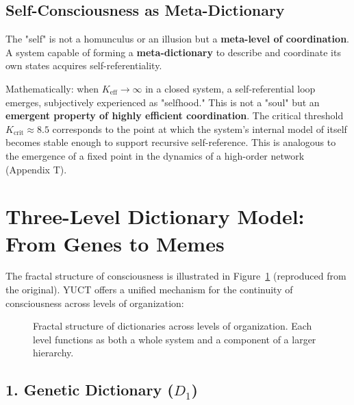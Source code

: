 \documentclass[12pt,a4paper]{article}
\newcommand{\eff}{\mathrm{eff}}
\newcommand{\Ke}{K_{\eff}}
\newcommand{\Kcrit}{K_{\mathrm{crit}}}
\begin{document}
	\subsection{Self-Consciousness as Meta-Dictionary}
	
	The "self" is not a homunculus or an illusion but a \textbf{meta-level of coordination}. A system capable of forming a \textbf{meta-dictionary} to describe and coordinate its own states acquires self-referentiality.
	
	Mathematically: when $\Ke \to \infty$ in a closed system, a self-referential loop emerges, subjectively experienced as "selfhood." This is not a "soul" but an \textbf{emergent property of highly efficient coordination}. The critical threshold $\Kcrit \approx 8.5$ corresponds to the point at which the system's internal model of itself becomes stable enough to support recursive self-reference. This is analogous to the emergence of a fixed point in the dynamics of a high-order network (Appendix T).
	
	\section{Three-Level Dictionary Model: From Genes to Memes}
	
	The fractal structure of consciousness is illustrated in Figure~\ref{fig:fractal_dict} (reproduced from the original). YUCT offers a unified mechanism for the continuity of consciousness across levels of organization:
	
	\begin{figure}[htbp]
		\centering
		\caption{Fractal structure of dictionaries across levels of organization. Each level functions as both a whole system and a component of a larger hierarchy.}
		\label{fig:fractal_dict}
	\end{figure}
	
	\subsection{1. Genetic Dictionary ($D_1$)}
	
\end{document}

